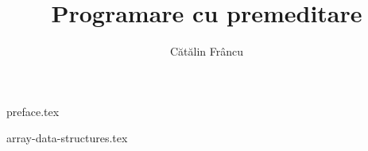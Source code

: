 \documentclass[12pt,openany]{book}
\title{Programare cu premeditare}
\author{Cătălin Frâncu}
\date{}
\begin{document}
\pagestyle{plain}

\hypersetup{pageanchor=false}

\begin{titlepage}
\maketitle
\end{titlepage}

\hypersetup{pageanchor=true}
\cleardoublepage

\mainmatter

{preface.tex}

\pagestyle{fancy}

\raggedbottom

\begingroup
\hypersetup{hidelinks} %
\tableofcontents
\endgroup

\cleardoublepage

{array-data-structures.tex}
\end{document}
